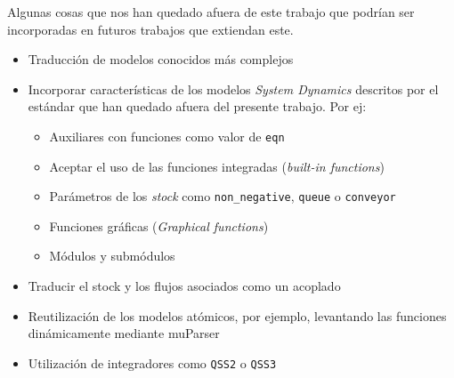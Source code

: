 Algunas cosas que nos han quedado afuera de este trabajo que podrían ser incorporadas en futuros trabajos que extiendan este.

\begin{itemize}
	\item Traducción de modelos conocidos más complejos
	\item Incorporar características de los modelos \textit{System Dynamics} descritos por el estándar que han quedado afuera del presente trabajo. Por ej:
	\begin{itemize}
		\item Auxiliares con funciones como valor de \texttt{eqn}
		\item Aceptar el uso de las funciones integradas (\textit{built-in functions})
		\item Parámetros de los \textit{stock} como \texttt{non\_negative}, \texttt{queue} o \texttt{conveyor}
		\item Funciones gráficas (\textit{Graphical functions}) 
		\item Módulos y submódulos
	\end{itemize}
	\item Traducir el stock y los flujos asociados como un acoplado
	\item Reutilización de los modelos atómicos, por ejemplo, levantando las funciones dinámicamente mediante muParser\cite{muparser} 
	\item Utilización de integradores como \texttt{QSS2} o \texttt{QSS3}
\end{itemize}